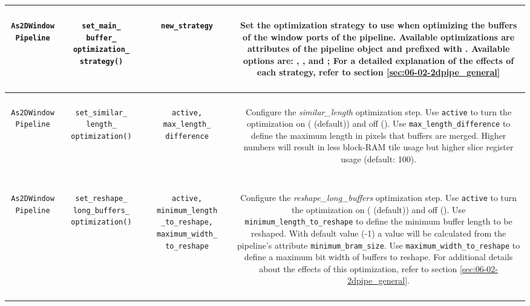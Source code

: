 \begin{longtable}[htbp]{|c|c|c|c|}
\hline
\parbox{2.5cm}{~\\ \texttt{As2DWindow Pipeline}\\~} & \parbox{3cm}{~\\ \texttt{set\_main\_ buffer\_ optimization\_ strategy()}\\~} & \parbox{3cm}{~ \\ \texttt{new\_strategy} \\ ~} & \parbox{6cm}{~\\ Set the optimization strategy to use when optimizing the buffers of the window ports of the pipeline. Available optimizations are attributes of the pipeline object and prefixed with . Available options are: , ,  and ; For a detailed explanation of the effects of each strategy, refer to section \ref{sec:06-02-2dpipe_general}\\~}\\
\hline
\parbox{2.5cm}{~\\ \texttt{As2DWindow Pipeline}\\~} & \parbox{3cm}{~\\ \texttt{set\_similar\_ length\_ optimization()}\\~} & \parbox{3cm}{~ \\ \texttt{active, max\_length\_ difference} \\ ~} & \parbox{6cm}{~\\ Configure the \textit{similar\_length} optimization step. Use \texttt{active} to turn the optimization on ( (default)) and off (). Use \texttt{max\_length\_difference} to define the maximum length in pixels that buffers are merged. Higher numbers will result in less block-RAM tile usage but higher slice register usage (default: 100). \\~}\\
\hline
\parbox{2.5cm}{~\\ \texttt{As2DWindow Pipeline}\\~} & \parbox{3cm}{~\\ \texttt{set\_reshape\_ long\_buffers\_ optimization()}\\~} & \parbox{3cm}{~ \\ \texttt{active, minimum\_length \_to\_reshape, maximum\_width\_ to\_reshape} \\ ~} & \parbox{6cm}{~\\ Configure the \textit{reshape\_long\_buffers} optimization step. Use \texttt{active} to turn the optimization on ( (default)) and off (). Use \texttt{minimum\_length\_to\_reshape} to define the minimum buffer length to be reshaped. With default value (-1) a value will be calculated from the pipeline's attribute \texttt{minimum\_bram\_size}. Use \texttt{maximum\_width\_to\_reshape} to define a maximum bit width of buffers to reshape. For additional details about the effects of this optimization, refer to section \ref{sec:06-02-2dpipe_general}. \\~}\\

\end{longtable}

